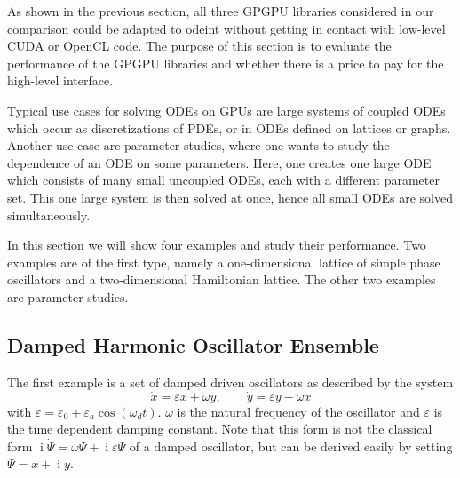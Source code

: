 \documentclass[final]{siamltex}
\newcommand {\ii} {\mathop{i}}
\begin{document}
As shown in the previous section, all three GPGPU libraries considered in our comparison
could be adapted to odeint without getting in contact with low-level CUDA or OpenCL code.
The purpose of this section is to evaluate the performance of the GPGPU libraries and whether there is a price to pay for the high-level interface.

Typical use cases for solving ODEs on GPUs are large systems of
coupled ODEs which occur as discretizations of PDEs, or in ODEs
defined on lattices or graphs. Another use case are parameter studies,
where one wants to study the dependence of an ODE on some
parameters. Here, one creates one large ODE which consists of many
small uncoupled ODEs, each with a different parameter set. This one
large system is then solved at once, hence all small ODEs are solved
simultaneously.

In this section we will show four examples and study their
performance. Two examples are of the first type, namely a
one-dimensional lattice of simple phase oscillators and a
two-dimensional Hamiltonian lattice. The other two examples are
parameter studies.




%
%
\subsection{Damped Harmonic Oscillator Ensemble}

The first example is a set of damped driven oscillators as described by the system
\begin{equation} \label{eq:dampedsystem}
    \dot{x} =  \varepsilon x + \omega y , \quad \quad
    \dot{y} =  \varepsilon y - \omega x
\end{equation}
with $\varepsilon = \varepsilon_0 + \varepsilon_a \cos \left( \omega_d    %
t \right)$. $\omega$ is the natural frequency of the oscillator and
$\varepsilon$ is the time dependent damping constant.  Note that this form is
not the classical form $\ii \dot{\Psi} = \omega \Psi + \ii \varepsilon \Psi$ of a damped oscillator,
but can be derived easily by setting $\Psi = x + \ii y$.
\end{document}
